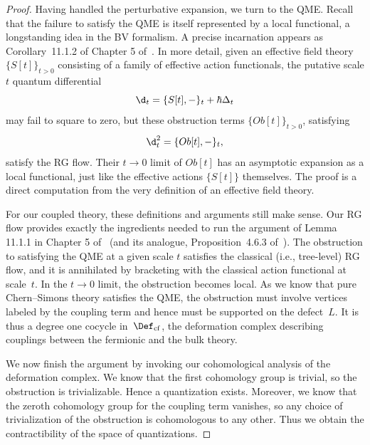 \documentclass[10pt]{amsart}
\begin{document}
\begin{proof}
Having handled the perturbative expansion, we turn to the QME.
Recall that the failure to satisfy the QME is itself represented by a local functional,
a longstanding idea in the BV formalism.
A precise incarnation appears as Corollary~11.1.2 of Chapter 5 of~\cite{CosBook}.  
In more detail, given an effective field theory $\{S[t]\}_{t > 0}$ consisting of a family of effective action functionals,
the putative scale $t$ quantum differential 
\[
\d_t = \{S[t], -\}_t + \hbar \Delta_t
\]
may fail to square to zero,
but these obstruction terms $\{Ob[t]\}_{t > 0}$, satisfying
\[
\d_t^2 = \{Ob[t], - \}_t,
\]
satisfy the RG flow. 
Their $t \to 0$ limit of $Ob[t]$ has an asymptotic expansion as a local functional,
just like the effective actions $\{S[t]\}$ themselves.
The proof is a direct computation from the very definition of an effective field theory.

For our coupled theory, these definitions and arguments still make sense.
Our RG flow provides exactly the ingredients needed to run the argument of Lemma 11.1.1 in Chapter 5 of~\cite{CosBook} (and its analogue, Proposition~4.6.3 of~\cite{RabThesis}).
The obstruction to satisfying the QME at a given scale $t$ satisfies the classical (i.e., tree-level) RG flow,
and it is annihilated by bracketing with the classical action functional at scale~$t$.
In the $t \to 0$ limit, the obstruction becomes local.
As we know that pure Chern--Simons theory satisfies the QME,
the obstruction must involve vertices labeled by the coupling term and hence must be supported on the defect~$L$.
It is thus a degree one cocycle in~$\Def_{\rm cf}$, 
the deformation complex describing couplings between the fermionic and the bulk theory.

We now finish the argument by invoking our cohomological analysis of the deformation complex.
We know that the first cohomology group is trivial, so the obstruction is trivializable.
Hence a quantization exists.
Moreover, we know that the zeroth cohomology group for the coupling term vanishes,
so any choice of trivialization of the obstruction is cohomologous to any other.
Thus we obtain the contractibility of the space of quantizations.
\end{proof}

\end{document}
